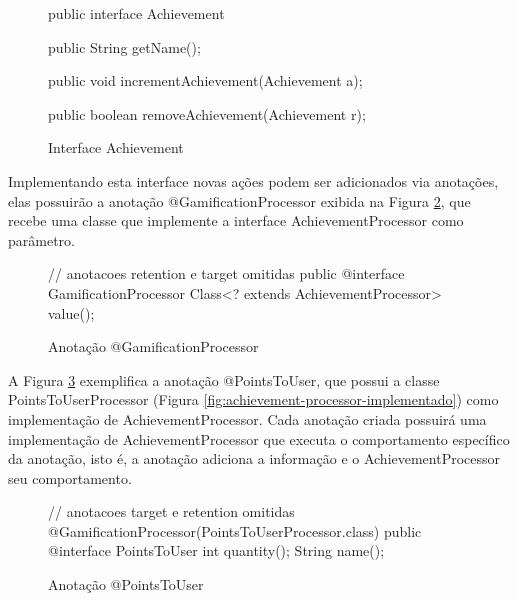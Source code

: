 \begin{figure}[H]
    \centering
    \caption{Interface Achievement}
    \begin{java}
public interface Achievement {
    
	public String getName();

	public void incrementAchievement(Achievement a);

	public boolean removeAchievement(Achievement r);
}
    \end{java}
    \label{fig:interface-achievement}
\end{figure}

\par Implementando esta interface novas ações podem ser adicionados via anotações, elas possuirão a anotação @GamificationProcessor exibida na Figura \ref{fig:gamification-processor}, que recebe uma classe que implemente a interface AchievementProcessor como parâmetro.

\begin{figure}[H]
    \centering
    \caption{Anotação @GamificationProcessor}
    \begin{java}
// anotacoes retention e target omitidas
public @interface GamificationProcessor {
	Class<? extends AchievementProcessor> value();
}

    \end{java}
    \label{fig:gamification-processor}
\end{figure}

\par A Figura \ref{fig:points-to-user} exemplifica a anotação @PointsToUser, que possui a classe PointsToUserProcessor (Figura \ref{fig:achievement-processor-implementado}) como implementação de AchievementProcessor. Cada anotação criada possuirá uma implementação de AchievementProcessor que executa o comportamento específico da anotação, isto é, a anotação adiciona a informação e o AchievementProcessor seu comportamento.


\begin{figure}[H]
    \centering
    \caption{Anotação @PointsToUser}
    \begin{java}
// anotacoes target e retention omitidas
@GamificationProcessor(PointsToUserProcessor.class)
public @interface PointsToUser {	
	int quantity();
	String name();
}
    \end{java}
    \label{fig:points-to-user}
\end{figure}

